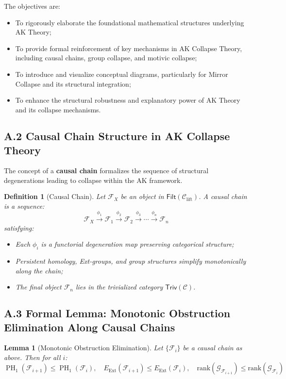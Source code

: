 \documentclass[11pt]{article}
\newtheorem{definition}[theorem]{Definition}
\newtheorem{lemma}[theorem]{Lemma}
\DeclareMathOperator{\PH}{PH}
\begin{document}
The objectives are:

\begin{itemize}
    \item To rigorously elaborate the foundational mathematical structures underlying AK Theory;
    \item To provide formal reinforcement of key mechanisms in AK Collapse Theory, including causal chains, group collapse, and motivic collapse;
    \item To introduce and visualize conceptual diagrams, particularly for Mirror Collapse and its structural integration;
    \item To enhance the structural robustness and explanatory power of AK Theory and its collapse mechanisms.
\end{itemize}

\subsection*{A.2 Causal Chain Structure in AK Collapse Theory}

The concept of a \textbf{causal chain} formalizes the sequence of structural degenerations leading to collapse within the AK framework.

\begin{definition}[Causal Chain]
Let $\mathcal{F}_X$ be an object in $\mathsf{Filt}(\mathcal{C}_{\mathrm{lift}})$. A causal chain is a sequence:
\[
\mathcal{F}_X \xrightarrow{\phi_1} \mathcal{F}_1 \xrightarrow{\phi_2} \mathcal{F}_2 \xrightarrow{\phi_3} \cdots \xrightarrow{\phi_n} \mathcal{F}_n
\]
satisfying:
\begin{itemize}
    \item Each $\phi_i$ is a functorial degeneration map preserving categorical structure;
    \item Persistent homology, Ext-groups, and group structures simplify monotonically along the chain;
    \item The final object $\mathcal{F}_n$ lies in the trivialized category $\mathsf{Triv}(\mathcal{C})$.
\end{itemize}
\end{definition}

\subsection*{A.3 Formal Lemma: Monotonic Obstruction Elimination Along Causal Chains}

\begin{lemma}[Monotonic Obstruction Elimination]
Let $\{\mathcal{F}_i\}$ be a causal chain as above. Then for all $i$:
\[
\PH_1(\mathcal{F}_{i+1}) \leq \PH_1(\mathcal{F}_i), \quad E_{\mathrm{Ext}}(\mathcal{F}_{i+1}) \leq E_{\mathrm{Ext}}(\mathcal{F}_i), \quad \mathrm{rank}(\mathcal{G}_{\mathcal{F}_{i+1}}) \leq \mathrm{rank}(\mathcal{G}_{\mathcal{F}_i})
\]
\end{lemma}
\end{document}
